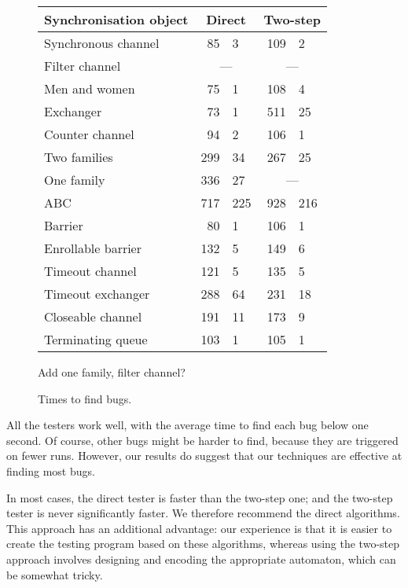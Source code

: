 
\begin{figure}
\begin{tabular}{lr@{$\,\pm\,$}lr@{$\,\pm\,$}l}
Synchronisation object & \multicolumn{2}{c}{Direct} &
\multicolumn{2}{c}{Two-step} \\ \hline
Synchronous channel  &	85 	 & 3 &  	109	 & 2 \\
Filter channel & \multicolumn{2}{c}{---} & \multicolumn{2}{c}{---} \\
Men and women  &	75	 & 1 &  	108	 & 4 \\
Exchanger  	&       73	 & 1 &  	511	 & 25 \\
Counter channel &  	94	 & 2 &  	106	 & 1 \\
Two families &  	299	 & 34 &  	267	 & 25 \\
One family &    	336	 & 27 & \multicolumn{2}{c}{---} \\
ABC &    	        717	 & 225 &  	928	 & 216 \\
Barrier &       	80	 & 1 &   	106	 & 1 \\
Enrollable barrier &  	132	 & 5 &  	149	 & 6 \\
Timeout channel  &	121	 & 5 &  	135	 & 5 \\
Timeout exchanger & 	288	 & 64 &  	231	 & 18 \\
Closeable channel & 	191	 & 11 &  	173	 & 9 \\
Terminating queue & 	103	 & 1 &  	105	 & 1
\end{tabular}

 Add one family, filter channel? %
\caption{Times to find bugs.}
\label{fig:bugFindingExperiment}
\end{figure}


All the testers work well, with the average time to find each bug below one
second.  Of course, other bugs might be harder to find, because they are
triggered on fewer runs.  However, our results do suggest that our techniques
are effective at finding most bugs.

In most cases, the direct tester is faster than the two-step one; and the
two-step tester is never significantly faster.  We therefore recommend the
direct algorithms.  This approach has an additional advantage: our experience
is that it is easier to create the testing program based on these algorithms,
whereas using the two-step approach involves designing and encoding the
appropriate automaton, which can be somewhat tricky. 

